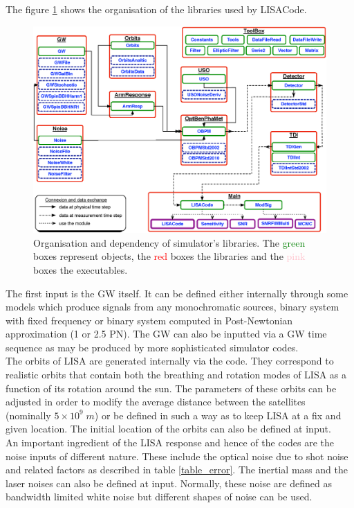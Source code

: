\documentclass[a4paper,english,12pt]{article}
\begin{document}
The figure \ref{Org_LISACode} shows the organisation of the libraries used by LISACode. \\

\begin{figure}[!h]
\centering \includegraphics[width=15cm]{Figures/StructureCode.eps}
\caption{\small Organisation and dependency of simulator's libraries. The  \textcolor{green}{green} boxes represent objects, the \textcolor{red}{red} boxes the libraries and the \textcolor{pink}{pink} boxes the executables.\small} 
\label{Org_LISACode}
\end{figure}

The first input is the GW itself. It can be defined either internally through some models which produce signals from any monochromatic sources, binary system with fixed frequency or binary system computed in Post-Newtonian approximation (1 or 2.5 PN). The GW can also be inputted via a GW time sequence as may be produced by more sophisticated simulator codes.  \\

The orbits of LISA are generated internally via the code. They correspond to realistic orbits that contain both the breathing and rotation modes of LISA as a function of its rotation around the sun. The parameters of these orbits can be adjusted in order to modify the average distance between the satellites (nominally $5 \times 10^{9} \; m$) or be defined in such a way as to keep LISA at a fix and given location. The initial location of the orbits can also be defined at input.\\

An important ingredient of the LISA response and hence of the codes are the noise inputs of different nature. These include the optical noise due to shot noise and related factors as described in table \ref{table_error}. The inertial mass and the laser noises can also be defined at input. Normally, these noise are defined as bandwidth limited white noise but different shapes of noise can be used.
\end{document}

